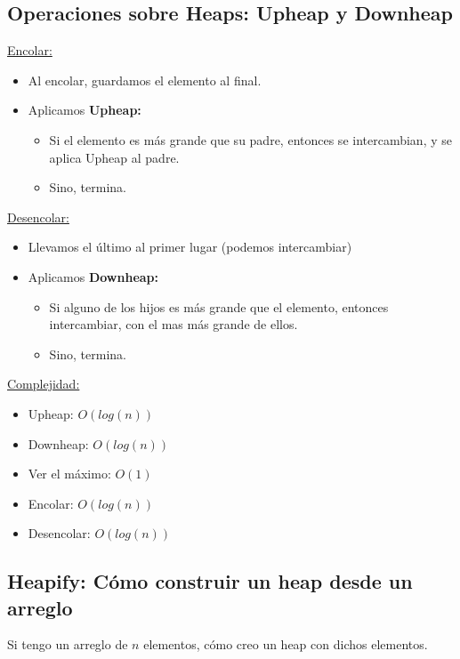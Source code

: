 \documentclass[../main.tex]{subfiles}
\begin{document}
    \subsection{Operaciones sobre Heaps: Upheap y Downheap}
        \underline{Encolar:}
        \begin{itemize}
            \item Al encolar, guardamos el elemento al final.
            \item Aplicamos \textbf{Upheap:}
                \begin{itemize}
                    \item Si el elemento es más grande que su padre, entonces se intercambian, y se aplica Upheap al padre.
                    \item Sino, termina.
                \end{itemize}
        \end{itemize}

        \underline{Desencolar:}
        \begin{itemize}
            \item Llevamos el último al primer lugar (podemos intercambiar)
            \item Aplicamos \textbf{Downheap:}
                \begin{itemize}
                    \item Si alguno de los hijos es más grande que el elemento, entonces intercambiar, con el mas más grande de ellos.
                    \item Sino, termina.
                \end{itemize}
        \end{itemize}

        \underline{Complejidad:}
        \begin{itemize}
            \item Upheap: $O(log(n))$
            \item Downheap: $O(log(n))$
            \item Ver el máximo: $O(1)$
            \item Encolar: $O(log(n))$
            \item Desencolar: $O(log(n))$
        \end{itemize}

        \subsection{Heapify: Cómo construir un heap desde un arreglo}
            Si tengo un arreglo de $n$ elementos, cómo creo un heap con dichos elementos.\\
\end{document}
